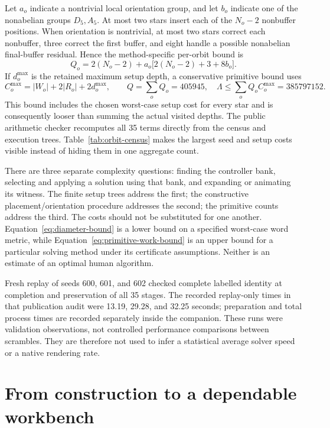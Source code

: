 \documentclass[a4paper,11pt]{article}
\begin{document}
Let \(a_o\) indicate a nontrivial local orientation group, and let \(b_o\) indicate one of the nonabelian groups \(D_5,A_5\). At most two stars insert each of the \(N_o-2\) nonbuffer positions. When orientation is nontrivial, at most two stars correct each nonbuffer, three correct the first buffer, and eight handle a possible nonabelian final-buffer residual. Hence the method-specific per-orbit bound is
\begin{equation}
Q_o=2(N_o-2)+a_o\bigl[2(N_o-2)+3+8b_o\bigr].
\label{eq:work-bound}
\end{equation}
If \(d_o^{\max}\) is the retained maximum setup depth, a conservative primitive bound uses
\begin{equation}
C_o^{\max}=|W_o|+2|R_o|+2d_o^{\max},\qquad
Q=\sum_o Q_o=405945,\quad
\Lambda\le\sum_o Q_o C_o^{\max}=385797152.
\label{eq:primitive-work-bound}
\end{equation}
This bound includes the chosen worst-case setup cost for every star and is consequently looser than summing the actual visited depths. The public arithmetic checker recomputes all 35 terms directly from the census and execution trees. Table~\ref{tab:orbit-census} makes the largest seed and setup costs visible instead of hiding them in one aggregate count.

There are three separate complexity questions: finding the controller bank, selecting and applying a solution using that bank, and expanding or animating its witness. The finite setup trees address the first; the constructive placement/orientation procedure addresses the second; the primitive counts address the third. The costs should not be substituted for one another. Equation~\eqref{eq:diameter-bound} is a lower bound on a specified worst-case word metric, while Equation~\eqref{eq:primitive-work-bound} is an upper bound for a particular solving method under its certificate assumptions. Neither is an estimate of an optimal human algorithm.

Fresh replay of seeds 600, 601, and 602 checked complete labelled identity at completion and preservation of all 35 stages. The recorded replay-only times in that publication audit were 13.19, 29.28, and 32.25 seconds; preparation and total process times are recorded separately inside the companion. These runs were validation observations, not controlled performance comparisons between scrambles. They are therefore not used to infer a statistical average solver speed or a native rendering rate.


\section{From construction to a dependable workbench}
\label{sec:7}
\end{document}
